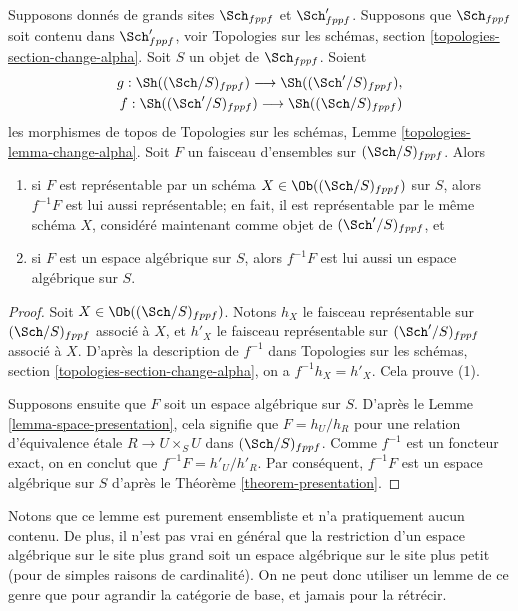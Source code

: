 \begin{lemma}
\label{lemma-change-big-site}
Supposons donnés de grands sites $\Sch_{fppf}$ et $\Sch'_{fppf}$.
Supposons que $\Sch_{fppf}$ soit contenu dans $\Sch'_{fppf}$,
voir Topologies sur les schémas, section \ref{topologies-section-change-alpha}.
Soit $S$ un objet de $\Sch_{fppf}$. Soient
\begin{align*}
g : \Sh((\Sch/S)_{fppf})
\longrightarrow
\Sh((\Sch'/S)_{fppf}), \\
f : \Sh((\Sch'/S)_{fppf})
\longrightarrow
\Sh((\Sch/S)_{fppf})
\end{align*}
les morphismes de topos de
Topologies sur les schémas, Lemme \ref{topologies-lemma-change-alpha}.
Soit $F$ un faisceau d'ensembles sur $(\Sch/S)_{fppf}$. Alors
\begin{enumerate}
\item si $F$ est représentable par un schéma
$X \in \Ob((\Sch/S)_{fppf})$ sur $S$,
alors $f^{-1}F$ est lui aussi représentable; en fait, il est représentable par le
même schéma $X$, considéré maintenant comme objet de $(\Sch'/S)_{fppf}$, et
\item si $F$ est un espace algébrique sur $S$, alors $f^{-1}F$ est lui aussi un
espace algébrique sur $S$.
\end{enumerate}
\end{lemma}

\begin{proof}
Soit $X \in \Ob((\Sch/S)_{fppf})$. Notons $h_X$ le
faisceau représentable sur $(\Sch/S)_{fppf}$ associé à $X$, et
$h'_X$ le faisceau représentable sur $(\Sch'/S)_{fppf}$ associé à
$X$. D'après la description de $f^{-1}$ dans
Topologies sur les schémas, section \ref{topologies-section-change-alpha},
on a $f^{-1}h_X = h'_X$. Cela prouve (1).

\medskip\noindent
Supposons ensuite que $F$
soit un espace algébrique sur $S$. D'après le Lemme \ref{lemma-space-presentation},
cela signifie que $F = h_U/h_R$ pour une relation d'équivalence \'etale
$R \to U \times_S U$ dans $(\Sch/S)_{fppf}$. Comme $f^{-1}$ est un
foncteur exact, on en conclut que $f^{-1}F = h'_U/h'_R$. Par conséquent,
$f^{-1}F$ est un espace algébrique sur $S$ d'après le Théorème \ref{theorem-presentation}.
\end{proof}

\noindent
Notons que ce lemme est purement ensembliste et n'a pratiquement aucun contenu.
De plus, il n'est pas vrai en général que la restriction d'un espace
algébrique sur le site plus grand soit un espace algébrique sur le site plus petit
(pour de simples raisons de cardinalité). On ne peut donc utiliser un lemme
de ce genre que pour agrandir la catégorie de base, et jamais pour la rétrécir.

